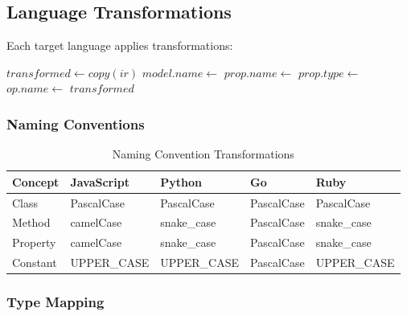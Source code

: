 \documentclass[11pt,a4paper]{article}
\begin{document}
\subsection{Language Transformations}

Each target language applies transformations:

\begin{algorithm}
\caption{Language-Specific Transformation}
\begin{algorithmic}[1]
    \State $transformed \gets copy(ir)$
        \State $model.name \gets$ 
            \State $prop.name \gets$ 
            \State $prop.type \gets$ 
        \EndFor
    \EndFor
            \State $op.name \gets$ 
        \EndFor
    \EndFor
    \State \Return $transformed$
\EndFunction
\end{algorithmic}
\end{algorithm}

\subsubsection{Naming Conventions}

\begin{table}[h]
\centering
\caption{Naming Convention Transformations}
\begin{tabular}{lllll}
\toprule
\textbf{Concept} & \textbf{JavaScript} & \textbf{Python} & \textbf{Go} & \textbf{Ruby} \\
\midrule
Class & PascalCase & PascalCase & PascalCase & PascalCase \\
Method & camelCase & snake\_case & PascalCase & snake\_case \\
Property & camelCase & snake\_case & PascalCase & snake\_case \\
Constant & UPPER\_CASE & UPPER\_CASE & PascalCase & UPPER\_CASE \\
\bottomrule
\end{tabular}
\end{table}

\subsubsection{Type Mapping}
\end{document}
